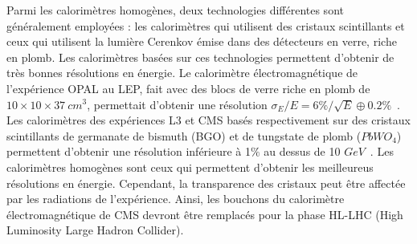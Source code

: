Parmi les calorimètres homogènes, deux technologies différentes sont généralement employées : les calorimètres qui utilisent des cristaux scintillants et ceux qui utilisent la lumière Cerenkov émise dans des détecteurs en verre, riche en plomb. Les calorimètres basées sur ces technologies permettent d'obtenir de très bonnes résolutions en énergie. Le calorimètre électromagnétique de l'expérience OPAL au LEP, fait avec des blocs de verre riche en plomb de $10\times10\times37~cm^3$, permettait d'obtenir une résolution $\sigma_E/E=6\%/\sqrt{E}\oplus0.2\%$~\cite{opal}. Les calorimètres des expériences L3 et CMS basés respectivement sur des cristaux scintillants de germanate de bismuth (BGO) et de tungstate de plomb ($PbWO_4$) permettent d'obtenir une résolution inférieure à 1$\%$ au dessus de 10 $GeV$~\cite{l3-bgo,cms-pwo}. Les calorimètres homogènes sont ceux qui permettent d'obtenir les meilleureus résolutions en énergie. Cependant, la transparence des cristaux peut être affectée par les radiations de l'expérience. Ainsi, les bouchons du calorimètre électromagnétique de CMS devront être remplacés pour la phase HL-LHC (High Luminosity Large Hadron Collider). 

